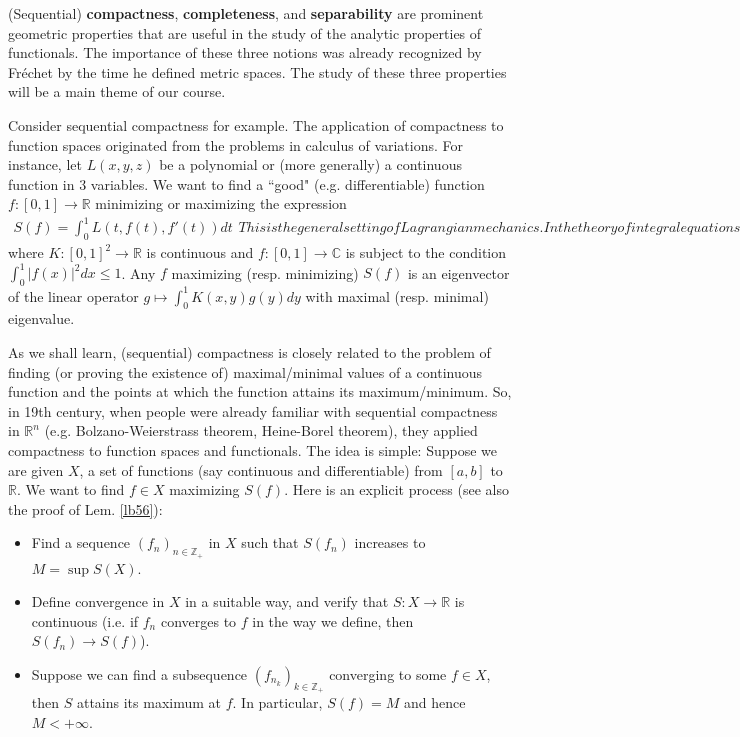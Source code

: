 \documentclass[12pt,b5paper,notitlepage]{article}
\theoremstyle{definition}
\theoremstyle{plain}
\newcommand{\ovl}{\overline}
\newcommand{\Cbb}{\mathbb C}
\newcommand{\Zbb}{\mathbb Z}
\newcommand{\Rbb}{\mathbb R}
\numberwithin{equation}{section}
\begin{document}
(Sequential) \textbf{compactness}, \textbf{completeness}, and \textbf{separability} are prominent geometric properties that are useful in the study of the analytic properties of functionals. The importance of these three notions  was  already recognized by Fr\'echet by the time he defined metric spaces. The study of these three properties will be a main theme of our course.


Consider sequential compactness for example. The application of compactness to function spaces originated from the problems in calculus of variations. For instance, let $L(x,y,z)$ be a polynomial or (more generally) a continuous function in $3$ variables. We want to find a ``good" (e.g. differentiable) function $f:[0,1]\rightarrow \Rbb$ minimizing or maximizing the expression
\begin{subequations}\label{eq24}
\begin{align}
S(f)=\int_0^1 L(t,f(t),f'(t))dt
\end{align}
This is the general setting of Lagrangian mechanics. In the theory of integral equations, one considers the extreme values and points of the functional
\begin{align}
S(f)=\int_0^1\int_0^1 f(x)K(x,y)\ovl{f(y)}dxdy
\end{align}
\end{subequations}
where $K:[0,1]^2\rightarrow\Rbb$ is continuous and $f:[0,1]\rightarrow\Cbb$ is subject to the condition $\int_0^1 |f(x)|^2dx\leq 1$. Any $f$ maximizing (resp. minimizing) $S(f)$ is an eigenvector of the linear operator $g\mapsto \int_0^1 K(x,y)g(y)dy$ with maximal (resp. minimal) eigenvalue.


As we shall learn, (sequential) compactness is closely related to the problem of finding (or proving the existence of) maximal/minimal values of a continuous function and the points at which the function attains its maximum/minimum. So, in 19th century, when people were already familiar with sequential compactness in $\Rbb^n$ (e.g. Bolzano-Weierstrass theorem, Heine-Borel theorem), they applied compactness to function spaces and functionals. The idea is simple: Suppose we are given $X$, a set of functions (say continuous and differentiable) from $[a,b]$ to $\Rbb$. We want to find $f\in X$ maximizing $S(f)$. Here is an explicit process (see also the proof of Lem. \ref{lb56}):
\begin{itemize}
\item[(A)] Find a sequence $(f_n)_{n\in\Zbb_+}$ in $X$ such that $S(f_n)$ increases to $M=\sup S(X)$. 
\item[(B)] Define convergence in $X$ in a suitable way, and verify that $S:X\rightarrow\Rbb$ is continuous (i.e. if $f_n$ converges to $f$ in the way we define, then $S(f_n)\rightarrow S(f)$). 
\item[(C)] Suppose we can find a subsequence $(f_{n_k})_{k\in\Zbb_+}$ converging to some $f\in X$, then $S$ attains its maximum at $f$. In particular, $S(f)=M$ and hence $M<+\infty$. 
\end{itemize}
\end{document}
